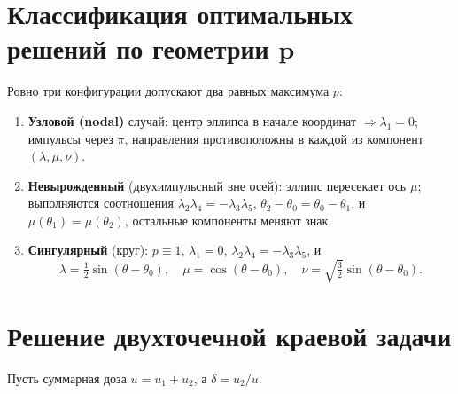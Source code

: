 \documentclass[12pt,a4paper]{article}
\newcommand{\vv}[1]{\bm{#1}}
\begin{document}
\section{Классификация оптимальных решений по геометрии $\vv p$}
Ровно три конфигурации допускают два равных максимума $p$:
\begin{enumerate}[label=\textbf{(\alph*)}]
\item \textbf{Узловой (nodal)} случай: центр эллипса в начале координат $\Rightarrow \lambda_1=0$; импульсы через $\pi$, направления противоположны в каждой из компонент $(\lambda,\mu,\nu)$.
\item \textbf{Невырожденный} (двухимпульсный вне осей): эллипс пересекает ось $\mu$; выполняются соотношения
$\lambda_2\lambda_4=-\lambda_3\lambda_5$, $\theta_2-\theta_0=\theta_0-\theta_1$, и $\mu(\theta_1)=\mu(\theta_2)$, остальные компоненты меняют знак.
\item \textbf{Сингулярный} (круг): $p\equiv1$, $\lambda_1=0$, $\lambda_2\lambda_4=-\lambda_3\lambda_5$, и
\begin{equation}
\lambda=\tfrac12\sin(\theta-\theta_0),\quad \mu=\cos(\theta-\theta_0),\quad \nu=\sqrt{\tfrac32}\sin(\theta-\theta_0).
\end{equation}
\end{enumerate}

\section{Решение двухточечной краевой задачи}
Пусть суммарная доза $u=u_1+u_2$, а $\delta=u_2/u$.
\end{document}
